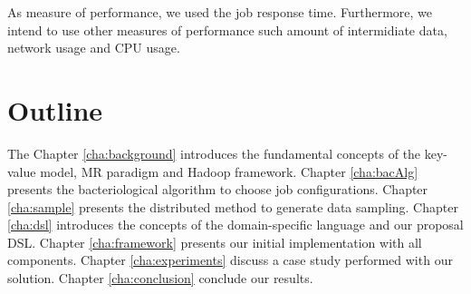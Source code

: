 As measure of performance, we used the job response time. Furthermore, we intend
to use other measures of performance such amount of intermidiate data,
network usage and CPU usage.

\section{Outline}

The Chapter \ref{cha:background} introduces the fundamental concepts of the
key-value model, MR paradigm and Hadoop framework. Chapter \ref{cha:bacAlg}
presents the bacteriological algorithm to choose job configurations. Chapter
\ref{cha:sample} presents the
distributed method to generate data sampling. Chapter \ref{cha:dsl} introduces
the concepts of the domain-specific language and our proposal DSL. Chapter \ref{cha:framework}
presents our initial implementation with all components. Chapter \ref{cha:experiments}
discuss a case study performed with our solution. Chapter \ref{cha:conclusion}
conclude our results.




